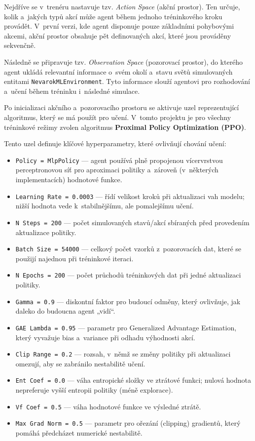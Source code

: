 Nejdříve se v~trenéru nastavuje tzv. \textit{Action Space} (akční prostor). Ten určuje, kolik a~jakých typů akcí může agent během jednoho tréninkového kroku provádět. V~první verzi, kde agent disponuje pouze základními pohybovými akcemi, akční prostor obsahuje pět definovaných akcí, které jsou prováděny sekvenčně.

Následně se připravuje tzv. \textit{Observation Space} (pozorovací prostor), do kterého agent ukládá relevantní informace o~svém okolí a~stavu světů simulovaných entitami \texttt{NevarokMLEnvironment}. Tyto informace slouží agentovi pro rozhodování a~učení během tréninku i~následné simulace.

Po inicializaci akčního a~pozorovacího prostoru se aktivuje uzel reprezentující algoritmus, který se má použít pro učení. V~tomto projektu je pro všechny tréninkové režimy zvolen algoritmus \textbf{Proximal Policy Optimization (PPO)}.

\newpage

Tento uzel definuje klíčové hyperparametry, které ovlivňují chování učení:

\begin{itemize}
    \item \texttt{Policy = MlpPolicy} — agent používá plně propojenou vícervrstvou perceptronovou síť pro aproximaci politiky a~zároveň (v~některých implementacích) hodnotové funkce.
    \item \texttt{Learning Rate = 0.0003} — řídí velikost kroků při aktualizaci vah modelu; nižší hodnota vede k~stabilnějšímu, ale pomalejšímu učení.
    \item \texttt{N Steps = 200} — počet simulovaných stavů/akcí sbíraných před provedením aktualizace politiky.
    \item \texttt{Batch Size = 54000} — celkový počet vzorků z~pozorovacích dat, které se použijí najednou při tréninkové iteraci.
    \item \texttt{N Epochs = 200} — počet průchodů tréninkových dat při jedné aktualizaci politiky.
    \item \texttt{Gamma = 0.9} — diskontní faktor pro budoucí odměny, který ovlivňuje, jak daleko do budoucna agent „vidí“.
    \item \texttt{GAE Lambda = 0.95} — parametr pro Generalized Advantage Estimation, který vyvažuje bias a~variance při odhadu výhodnosti akcí.
    \item \texttt{Clip Range = 0.2} — rozsah, v~němž se změny politiky při aktualizaci omezují, aby se zabránilo nestabilitě učení.
    \item \texttt{Ent Coef = 0.0} — váha entropické složky ve ztrátové funkci; nulová hodnota nepreferuje vyšší entropii politiky (méně explorace).
    \item \texttt{Vf Coef = 0.5} — váha hodnotové funkce ve výsledné ztrátě.
    \item \texttt{Max Grad Norm = 0.5} — parametr pro ořezání (clipping) gradientů, který pomáhá předcházet numerické nestabilitě.
\end{itemize}

